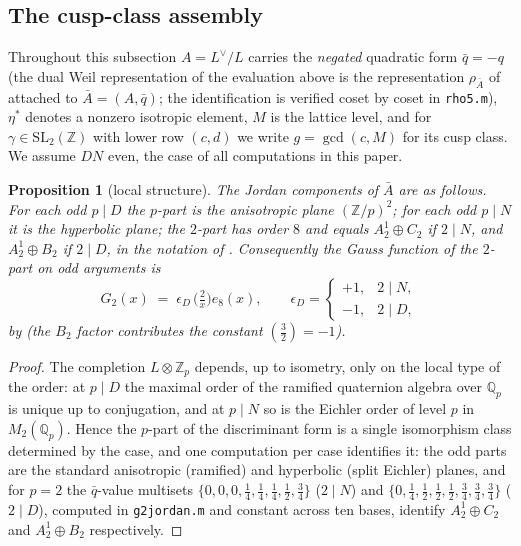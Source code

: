 \documentclass[11pt,reqno]{amsart}
\theoremstyle{plain}
\newtheorem{proposition}[theorem]{Proposition}
\theoremstyle{definition}
\newcommand{\Q}{\mathbb{Q}}
\newcommand{\Z}{\mathbb{Z}}
\newcommand{\Ldual}{L^{\vee}}
\begin{document}
\subsection*{The cusp-class assembly}
Throughout this subsection $A=\Ldual/L$ carries the \emph{negated} quadratic form
$\bar q=-q$ (the dual Weil representation of the evaluation above is the representation
$\rho_{\bar A}$ of \cite{Stromberg2013} attached to $\bar A=(A,\bar q)$; the identification
is verified coset by coset in \texttt{rho5.m}), $\eta^*$ denotes a nonzero isotropic
element, $M$ is the lattice level, and for $\gamma\in\mathrm{SL}_2(\Z)$ with lower row
$(c,d)$ we write $g=\gcd(c,M)$ for its cusp class. We assume $DN$ even, the case of all
computations in this paper.

\begin{proposition}[local structure]\label{prop:jordan}
The Jordan components of $\bar A$ are as follows. For each odd $p\mid D$ the $p$-part is
the anisotropic plane $(\Z/p)^2$; for each odd $p\mid N$ it is the hyperbolic plane; the
$2$-part has order $8$ and equals $A_2^1\oplus C_2$ if $2\mid N$, and $A_2^1\oplus B_2$ if
$2\mid D$, in the notation of \cite[\S2]{Stromberg2013}. Consequently the Gauss function
of the $2$-part on odd arguments is
\[
  G_2(x)\;=\;\epsilon_D\,\bigl(\tfrac2x\bigr)e_8(x),\qquad
  \epsilon_D=\begin{cases}+1,&2\mid N,\\ -1,&2\mid D,\end{cases}
\]
by \cite[Lemmas 3.7, 3.8]{Stromberg2013} (the $B_2$ factor contributes the constant
$(\tfrac32)=-1$).
\end{proposition}

\begin{proof}
The completion $L\otimes\Z_p$ depends, up to isometry, only on the local type of the
order: at $p\mid D$ the maximal order of the ramified quaternion algebra over $\Q_p$ is
unique up to conjugation, and at $p\mid N$ so is the Eichler order of level $p$ in
$M_2(\Q_p)$. Hence the $p$-part of the discriminant form is a single isomorphism class
determined by the case, and one computation per case identifies it: the odd parts are the
standard anisotropic (ramified) and hyperbolic (split Eichler) planes, and for $p=2$ the
$\bar q$-value multisets $\{0,0,0,\tfrac14,\tfrac14,\tfrac14,\tfrac12,\tfrac34\}$
($2\mid N$) and $\{0,\tfrac14,\tfrac12,\tfrac12,\tfrac12,\tfrac34,\tfrac34,\tfrac34\}$
($2\mid D$), computed in \texttt{g2jordan.m} and constant across ten bases, identify
$A_2^1\oplus C_2$ and $A_2^1\oplus B_2$ respectively.
\end{proof}
\end{document}
